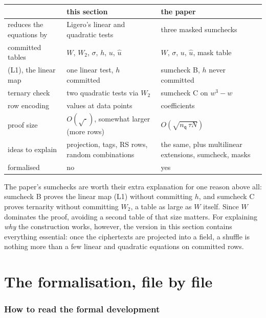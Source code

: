 \documentclass[11pt,a4paper]{article}
\newcommand{\nq}{n_{\mathsf{q}}}
\newcommand{\uh}{\hat{u}}
\theoremstyle{definition}
\theoremstyle{plain}
\begin{document}
\begin{center}\small
\begin{tabular}{@{}p{}p{}p{}@{}}
\toprule
 & this section & the paper\\
\midrule
reduces the equations by & Ligero's linear and quadratic tests & three masked sumchecks\\
committed tables & $W$, $W_2$, $\sigma$, $h$, $u$, $\uh$ & $W$, $\sigma$, $u$, $\uh$, mask table\\
(L1), the linear map & one linear test, $h$ committed & sumcheck B, $h$ never committed\\
ternary check & two quadratic tests via $W_2$ & sumcheck C on $w^3-w$\\
row encoding & values at data points & coefficients\\
proof size & $O(\sqrt{\cdot})$, somewhat larger (more rows) & $O(\sqrt{\nq\,\tau N})$\\
ideas to explain & projection, tags, RS rows, random combinations & the same, plus multilinear extensions, sumcheck, masks\\
formalised & no & yes\\
\bottomrule
\end{tabular}
\end{center}

The paper's sumchecks are worth their extra explanation for one reason above all: sumcheck B proves
the linear map (L1) without committing $h$, and sumcheck C proves ternarity without committing $W_2$,
a table as large as $W$ itself. Since $W$ dominates the proof, avoiding a second table of that size
matters. For explaining \emph{why} the construction works, however, the version in this section
contains everything essential: once the ciphertexts are projected into a field, a shuffle is nothing
more than a few linear and quadratic equations on committed rows.

\part{The formalisation, file by file}
\label{part:formal}

\section{How to read the formal development}
\label{sec:formal-intro}
\end{document}
